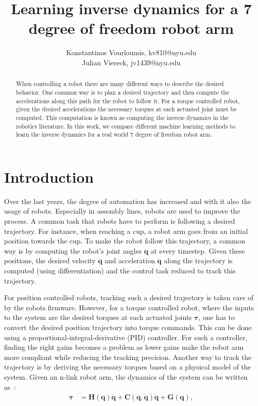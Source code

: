 \documentclass[letterpaper, 10 pt, conference]{ieeeconf}  %
\title{\LARGE \bf
Learning inverse dynamics for a 7 degree of freedom robot arm
}
\author{Konstantinos Vourloumis, kv810@nyu.edu\\ Julian Viereck, jv1439@nyu.edu}
\renewcommand{\b}[1]{\bm{#1}}
\begin{document}
\maketitle
\thispagestyle{empty}
\pagestyle{empty}


\begin{abstract}

When controlling a robot there are many different ways to describe the desired behavior. One common way is to plan a desired trajectory and then compute the accelerations along this path for the robot to follow it. For a torque controlled robot, given the desired accelerations the necessary torques at each actuated joint must be computed. This computation is known as computing the inverse dynamics in the robotics literature. In this work, we compare different machine learning methods to learn the inverse dynamics for a real world 7 degree of freedom robot arm.
\end{abstract}


\section{Introduction}

Over the last years, the degree of automation has increased and with it also the usage of robots. Especially in assembly lines, robots are used to improve the process. A common task that robots have to perform is following a desired trajectory. For instance, when reaching a cup, a robot arm goes from an initial position towards the cup. To make the robot follow this trajectory, a common way is by computing the robot's joint angles $\b{q}$ at every timestep. Given these positions, the desired velocity $\b{\dot{q}}$ and acceleration $\b{\ddot{q}}$ along the trajectory is computed (using differentiation) and the control task reduced to track this trajectory.

For position controlled robots, tracking such a desired trajectory is taken care of by the robots firmware. However, for a torque controlled robot, where the inputs to the system are the desired torques at each actuated joints $\b{\tau}$, one has to convert the desired position trajectory into torque commands. This can be done using a proportional-integral-derivative (PID) controller. For such a controller, finding the right gains becomes a problem as lower gains make the robot arm more compliant while reducing the tracking precision. Another way to track the trajectory is by deriving the necessary torques based on a physical model of the system. Given an n-link robot arm, the dynamics of the system can be written as~\cite{murray2017mathematical}:
~
\begin{align}
\label{eq:dyn_tau}
\b{\tau} &= \b{H}(\b{q})\b{\ddot{q}} + \b{C}(\b{q}, \dot{\b{q}})\dot{\b{q}} + \b{G}(\b{q}),
\end{align}
\end{document}
